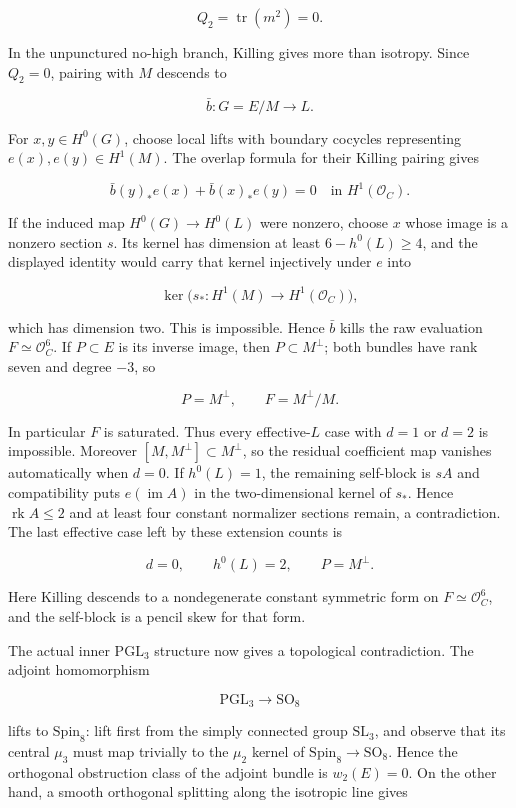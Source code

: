 \documentclass[11pt]{article}
\theoremstyle{definition}
\begin{document}
\[Q_2=\operatorname{tr}(m^2)=0.\]

In the unpunctured no-high branch, Killing gives more than isotropy.
Since \(Q_2=0\), pairing with \(M\) descends to

\[\bar b:G=E/M\longrightarrow L.\]

For \(x,y\in H^0(G)\), choose local lifts with boundary cocycles
representing \(e(x),e(y)\in H^1(M)\). The overlap formula for their
Killing pairing gives

\[\bar b(y)_*e(x)+\bar b(x)_*e(y)=0
\quad\text{in }H^1(\mathcal O_C).\]

If the induced map \(H^0(G)\to H^0(L)\) were nonzero, choose \(x\) whose
image is a nonzero section \(s\). Its kernel has dimension at least
\(6-h^0(L)\ge4\), and the displayed identity would carry that kernel
injectively under \(e\) into

\[\ker\bigl(s_*:H^1(M)\longrightarrow H^1(\mathcal O_C)\bigr),\]

which has dimension two. This is impossible. Hence \(\bar b\) kills the
raw evaluation \(F\simeq\mathcal O_C^6\). If \(P\subset E\) is its
inverse image, then \(P\subset M^\perp\); both bundles have rank seven
and degree \(-3\), so

\[P=M^\perp,
\qquad F=M^\perp/M.\]

In particular \(F\) is saturated. Thus every effective-\(L\) case with
\(d=1\) or \(d=2\) is impossible. Moreover
\([M,M^\perp]\subset M^\perp\), so the residual coefficient map vanishes
automatically when \(d=0\). If \(h^0(L)=1\), the remaining self-block is
\(sA\) and compatibility puts \(e(\operatorname{im}A)\) in the
two-dimensional kernel of \(s_*\). Hence \(\operatorname{rk}A\le2\) and
at least four constant normalizer sections remain, a contradiction. The
last effective case left by these extension counts is

\[d=0,\qquad h^0(L)=2,\qquad P=M^\perp.\]

Here Killing descends to a nondegenerate constant symmetric form on
\(F\simeq\mathcal O_C^6\), and the self-block is a pencil skew for that
form.

The actual inner \(\mathrm{PGL}_3\) structure now gives a topological
contradiction. The adjoint homomorphism

\[\mathrm{PGL}_3\longrightarrow\mathrm{SO}_8\]

lifts to \(\mathrm{Spin}_8\): lift first from the simply connected group
\(\mathrm{SL}_3\), and observe that its central \(\mu_3\) must map
trivially to the \(\mu_2\) kernel of
\(\mathrm{Spin}_8\to\mathrm{SO}_8\). Hence the orthogonal obstruction
class of the adjoint bundle is \(w_2(E)=0\). On the other hand, a smooth
orthogonal splitting along the isotropic line gives
\end{document}
